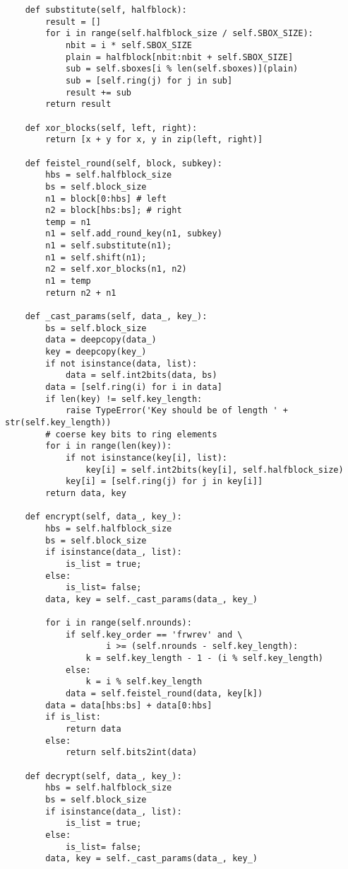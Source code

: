 \begin{appendices}
\begin{lstlisting}
    def substitute(self, halfblock):
        result = []
        for i in range(self.halfblock_size / self.SBOX_SIZE):
            nbit = i * self.SBOX_SIZE
            plain = halfblock[nbit:nbit + self.SBOX_SIZE]
            sub = self.sboxes[i % len(self.sboxes)](plain)
            sub = [self.ring(j) for j in sub]
            result += sub
        return result

    def xor_blocks(self, left, right):
        return [x + y for x, y in zip(left, right)]

    def feistel_round(self, block, subkey):
        hbs = self.halfblock_size
        bs = self.block_size
        n1 = block[0:hbs] # left
        n2 = block[hbs:bs]; # right
        temp = n1
        n1 = self.add_round_key(n1, subkey)
        n1 = self.substitute(n1);
        n1 = self.shift(n1);
        n2 = self.xor_blocks(n1, n2)
        n1 = temp
        return n2 + n1

    def _cast_params(self, data_, key_):
        bs = self.block_size
        data = deepcopy(data_)
        key = deepcopy(key_)
        if not isinstance(data, list):
            data = self.int2bits(data, bs)
        data = [self.ring(i) for i in data]
        if len(key) != self.key_length:
            raise TypeError('Key should be of length ' + str(self.key_length))
        # coerse key bits to ring elements
        for i in range(len(key)):
            if not isinstance(key[i], list):
                key[i] = self.int2bits(key[i], self.halfblock_size)
            key[i] = [self.ring(j) for j in key[i]]
        return data, key

    def encrypt(self, data_, key_):
        hbs = self.halfblock_size
        bs = self.block_size
        if isinstance(data_, list):
            is_list = true;
        else:
            is_list= false;
        data, key = self._cast_params(data_, key_)

        for i in range(self.nrounds):
            if self.key_order == 'frwrev' and \
                    i >= (self.nrounds - self.key_length):
                k = self.key_length - 1 - (i % self.key_length)
            else:
                k = i % self.key_length
            data = self.feistel_round(data, key[k])
        data = data[hbs:bs] + data[0:hbs]
        if is_list:
            return data
        else:
            return self.bits2int(data)

    def decrypt(self, data_, key_):
        hbs = self.halfblock_size
        bs = self.block_size
        if isinstance(data_, list):
            is_list = true;
        else:
            is_list= false;
        data, key = self._cast_params(data_, key_)


\end{lstlisting}
\end{appendices}
